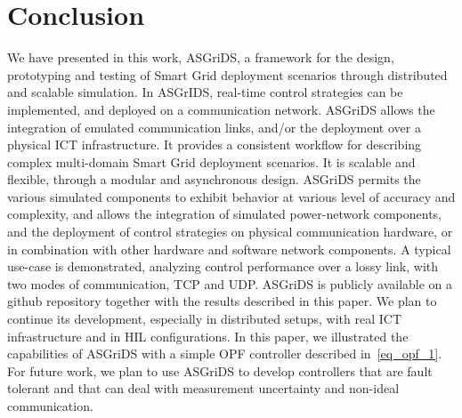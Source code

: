 \documentclass[conference]{IEEEtran}
\begin{document}

\section{Conclusion}
We have presented in this work, ASGriDS, a framework for the design, prototyping and testing of Smart Grid deployment scenarios through distributed and scalable simulation. In ASGrIDS, real-time control strategies can be implemented, and deployed on a communication network. ASGriDS allows the integration of emulated communication links, and/or the deployment over a physical ICT infrastructure. It provides a consistent workflow for describing complex multi-domain Smart Grid deployment scenarios. It is scalable and flexible, through a modular and asynchronous design. ASGriDS permits the various simulated components to exhibit behavior at various level of accuracy and complexity, and allows the integration of simulated power-network components, and the deployment of control strategies on physical communication hardware, or in combination with other hardware and software network components. A typical use-case is demonstrated, analyzing control performance over a lossy link, with two modes of communication, TCP and UDP.
ASGriDS is publicly available on a github repository\cite{TakiennAsgrids} together with the results described in this paper. We plan to continue its development, especially in distributed setups, with real ICT infrastructure and in HIL configurations. In this paper, we illustrated the capabilities of ASGriDS with a simple OPF controller described in~\eqref{eq_opf_1}. For future work, we plan to use ASGriDS to develop controllers that are fault tolerant and that can deal with measurement uncertainty and non-ideal communication.

  

\end{document}
